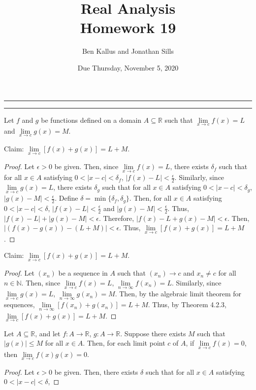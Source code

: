 \documentclass[12pt]{article}
\title{Real Analysis \\ Homework 19}
\author{Ben Kallus and Jonathan Sills}
\date{Due Thursday, November 5, 2020}
\begin{document}
\pagecolor{black}
\color{white}
\maketitle

\hrule
\bigskip


\bigskip
\hrule
\bigskip

 Let $f$ and $g$ be functions defined on a domain $A \subseteq \mathbb R$ such that $\lim\limits_{x\to c}f(x)=L$ and $\lim\limits_{x\to c}g(x) = M$.

\medskip
{} Claim: $\lim\limits_{x \to c}[f(x) + g(x)] = L + M$.
\begin{proof}
    Let $\epsilon > 0$ be given.
    Then, since $\lim\limits_{x\to c}f(x)=L$, there exists $\delta_f$ such that for all $x \in A$ satisfying $0 < |x - c| < \delta_f$, $|f(x) - L| < \frac\epsilon2$.
    Similarly, since $\lim\limits_{x\to c}g(x)=L$, there exists $\delta_g$ such that  for all $x \in A$ satisfying $0 < |x - c| < \delta_g$, $|g(x) - M| < \frac\epsilon2$.
    Define $\delta = \min\{\delta_f, \delta_g\}$.
    Then, for all $x \in A$ satisfying $0 < |x - c| < \delta$, $|f(x) - L| < \frac\epsilon2$ and $|g(x) - M| < \frac\epsilon2$.
    Thus, $|f(x) - L| + |g(x) - M| < \epsilon$.
    Therefore, $|f(x) - L + g(x) - M| < \epsilon$.
    Then, $|(f(x) - g(x)) - (L + M)| < \epsilon$.
    Thus, $\lim\limits_{x \to c}[f(x) + g(x)] = L + M$.
\end{proof}

\medskip
{} Claim: $\lim\limits_{x \to c}[f(x) + g(x)] = L + M$.
\begin{proof}
    Let $(x_n)$ be a sequence in $A$ such that $(x_n) \to c$ and $x_n \neq c$ for all $n \in \mathbb N$.
    Then, since $\lim\limits_{x\to c}f(x)=L$, $\lim\limits_{n\to \infty}f(x_n) = L$.
    Similarly, since $\lim\limits_{x\to c}g(x)=L$, $\lim\limits_{n\to \infty}g(x_n) = M$.
    Then, by the algebraic limit theorem for sequences, $\lim\limits_{n\to \infty}[f(x_n) + g(x_n)] = L + M$.
    Thus, by Theorem 4.2.3, $\lim\limits_{x \to c}[f(x) + g(x)] = L + M$.
\end{proof}

\newpage
{} Let $A \subseteq \mathbb R$, and let $f:A \to \mathbb R$, $g: A \to \mathbb R$. Suppose there exists $M$ such that $|g(x)| \leq M$ for all $x \in A$. Then, for each limit point $c$ of $A$, if $\lim\limits_{x \to c} f(x) = 0$, then $\lim\limits_{x \to c}f(x)g(x) = 0$.
\begin{proof}
    Let $\epsilon > 0$ be given. Then, there exists $\delta$ such that for all $x \in A$ satisfying $0 < |x -c| < \delta$, 
\end{proof}
\end{document}
